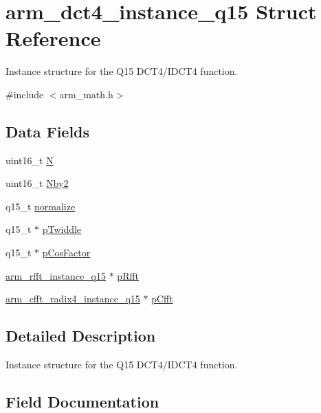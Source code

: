 \hypertarget{structarm__dct4__instance__q15}{}\section{arm\+\_\+dct4\+\_\+instance\+\_\+q15 Struct Reference}
\label{structarm__dct4__instance__q15}


Instance structure for the Q15 D\+C\+T4/\+I\+D\+C\+T4 function.  




{\ttfamily \#include $<$arm\+\_\+math.\+h$>$}

\subsection*{Data Fields}
\begin{DoxyCompactItemize}
\item 
uint16\+\_\+t \mbox{\hyperlink{structarm__dct4__instance__q15_a37d49571fe35012087153c093705cd11}{N}}
\item 
uint16\+\_\+t \mbox{\hyperlink{structarm__dct4__instance__q15_afa64b1618089e35c2b55cff71cb29715}{Nby2}}
\item 
q15\+\_\+t \mbox{\hyperlink{structarm__dct4__instance__q15_a8ba8c9fa75542dac82553fee982ccd3e}{normalize}}
\item 
q15\+\_\+t $\ast$ \mbox{\hyperlink{structarm__dct4__instance__q15_aa8c837c05b2c910342ab8f171d30dc02}{p\+Twiddle}}
\item 
q15\+\_\+t $\ast$ \mbox{\hyperlink{structarm__dct4__instance__q15_a9d858d313cbba67ceaef9704bc9c43b0}{p\+Cos\+Factor}}
\item 
\mbox{\hyperlink{structarm__rfft__instance__q15}{arm\+\_\+rfft\+\_\+instance\+\_\+q15}} $\ast$ \mbox{\hyperlink{structarm__dct4__instance__q15_aea6aa42c838f2b22c8c31e9e259b8d75}{p\+Rfft}}
\item 
\mbox{\hyperlink{structarm__cfft__radix4__instance__q15}{arm\+\_\+cfft\+\_\+radix4\+\_\+instance\+\_\+q15}} $\ast$ \mbox{\hyperlink{structarm__dct4__instance__q15_ae0ac7c3a89699793fc0dac960db7f056}{p\+Cfft}}
\end{DoxyCompactItemize}


\subsection{Detailed Description}
Instance structure for the Q15 D\+C\+T4/\+I\+D\+C\+T4 function. 

\subsection{Field Documentation}
\mbox{\label{structarm__dct4__instance__q15_a37d49571fe35012087153c093705cd11}} 
